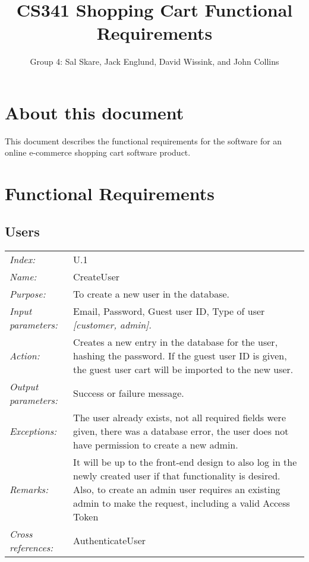 \documentclass[10pt,letter]{article}
\begin{document}

\title{CS341 Shopping Cart Functional Requirements}

\author{Group 4: Sal Skare, Jack Englund, David Wissink, and John Collins}

\maketitle 

\section{About this document} This document describes the functional requirements for the 
software for an online e-commerce shopping cart software product.

\section{Functional Requirements}

\subsection{Users}

\begin{tabularx}{\textwidth}{l X}
    \it{Index:} & U.1 \\
    \it{Name:} & CreateUser \\
    \it{Purpose:} & To create a new user in the database. \\
    \it{Input parameters:} & Email, Password, Guest user ID, Type of user \it{[customer, admin]}. \\
    \it{Action:} & Creates a new entry in the database for the user, hashing the password. If the guest 
    user ID is given, the guest user cart will be imported to the new user.\\
    \it{Output parameters:} & Success or failure message. \\
    \it{Exceptions:} & The user already exists, not all required fields were given, there 
    was a database error, the user does not have permission to create a new admin. \\
    \it{Remarks:} & It will be up to the front-end design to also log in the newly created 
    user if that functionality is desired. Also, to create an admin user requires an existing admin
    to make the request, including a valid Access Token\\
    \it{Cross references:} & AuthenticateUser \\
    \hline
\end{tabularx}
\end{document}
